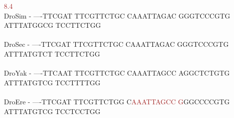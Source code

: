 \documentclass[11pt,twoside,reqno,a4paper]{article}
\begin{document}
{\hspace*{7\charwidth}\hspace*{1\charwidth}\hspace*{1\charwidth}\hspace*{1\charwidth}\hspace*{22\charwidth}\textcolor{Brown}{8.4}\hspace*{1\charwidth}\hspace*{1\charwidth}\hspace*{1\charwidth}\\
DroSim	-	----TTCGAT	TTCGTTCTGC	CAAATTAGAC	GGGTCCCGTG	ATTTATGGCG	TCCTTCTGG\\
\hspace*{7\charwidth}\hspace*{1\charwidth}\hspace*{1\charwidth}\hspace*{1\charwidth}\hspace*{1\charwidth}\hspace*{1\charwidth}\hspace*{1\charwidth}\\
DroSec	-	----TTCGAT	TTCGTTCTGC	CAAATTAGAC	GGGTCCCGTG	ATTTATGTCT	TCCTTCTGG\\
\hspace*{7\charwidth}\hspace*{1\charwidth}\hspace*{1\charwidth}\hspace*{1\charwidth}\hspace*{1\charwidth}\hspace*{1\charwidth}\hspace*{1\charwidth}\\
DroYak	-	----TTCAAT	TTCGTTCTGC	CAAATTAGCC	AGGCTCTGTG	ATTTATGTCG	TCCTTTTGG\\
\hspace*{7\charwidth}\hspace*{1\charwidth}\hspace*{1\charwidth}\hspace*{1\charwidth}\hspace*{1\charwidth}\hspace*{1\charwidth}\hspace*{1\charwidth}\\
DroEre	-	----TTCGAT	TTCGTTCTGG	C\textcolor{Brown}{A}\textcolor{Brown}{A}\textcolor{Brown}{A}\textcolor{Brown}{T}\textcolor{Brown}{T}\textcolor{Brown}{A}\textcolor{Brown}{G}\textcolor{Brown}{C}\textcolor{Brown}{C}	\textcolor{Brown}{G}GGCCCCGTG	ATTTATGTCG	TCCTCCTGG\\
}
\end{document}
